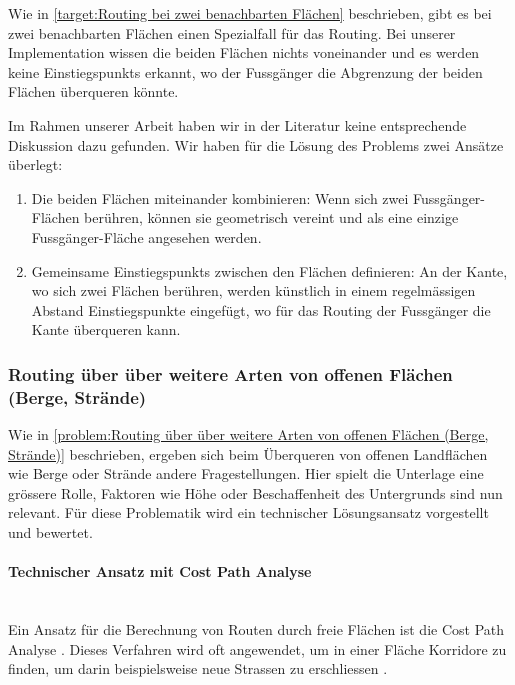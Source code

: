 Wie in \ref{target:Routing bei zwei benachbarten Flächen} beschrieben, gibt es bei zwei benachbarten Flächen einen Spezialfall für das Routing. Bei unserer Implementation wissen die beiden Flächen nichts voneinander und es werden keine \glspl{Einstiegspunkt} erkannt, wo der Fussgänger die Abgrenzung der beiden Flächen überqueren könnte.

Im Rahmen unserer Arbeit haben wir in der Literatur keine entsprechende Diskussion dazu gefunden. Wir haben für die Lösung des Problems zwei Ansätze überlegt:

\begin{enumerate}
    \item Die beiden Flächen miteinander kombinieren: Wenn sich zwei Fussgänger-Flächen berühren, können sie geometrisch vereint und als eine einzige Fussgänger-Fläche angesehen werden.
    \item Gemeinsame \glspl{Einstiegspunkt} zwischen den Flächen definieren: An der Kante, wo sich zwei Flächen berühren, werden künstlich in einem regelmässigen Abstand Einstiegspunkte eingefügt, wo für das Routing der Fussgänger die Kante überqueren kann.
\end{enumerate}


\subsubsection{Routing über über weitere Arten von offenen Flächen (Berge, Strände)}
\label{subsub:Routing über über weitere Arten von offenen Flächen (Berge, Strände)}

Wie in \ref{problem:Routing über über weitere Arten von offenen Flächen (Berge, Strände)} beschrieben, ergeben sich beim Überqueren von offenen Landflächen wie Berge oder Strände andere Fragestellungen. Hier spielt die Unterlage eine grössere Rolle, Faktoren wie Höhe oder Beschaffenheit des Untergrunds sind nun relevant. Für diese Problematik wird ein technischer Lösungsansatz vorgestellt und bewertet.

\paragraph{Technischer Ansatz mit Cost Path Analyse}~\\
Ein Ansatz für die Berechnung von Routen durch freie Flächen ist die Cost Path Analyse \cite{cost_path_analysis}. Dieses Verfahren wird oft angewendet, um in einer Fläche Korridore zu finden, um darin beispielsweise neue Strassen zu erschliessen \cite{gis-wiki:cost-path-analysis}.

